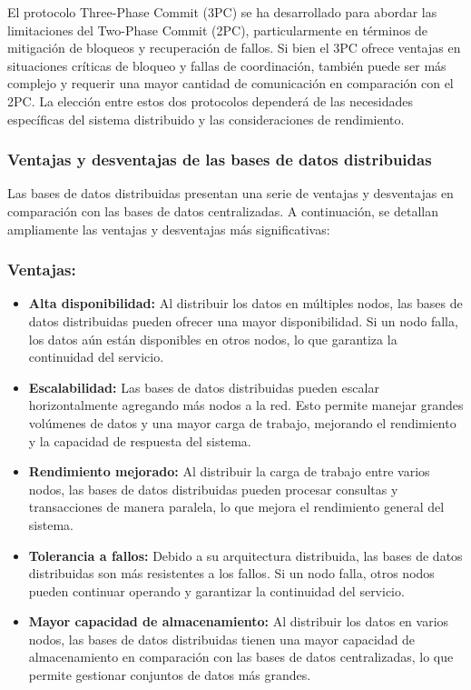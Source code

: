 \begin{tcolorbox}[colback=yellow!10!white, colframe=blue!50!black, title=Resumiendo, coltitle=white]
	El protocolo Three-Phase Commit (3PC) se ha desarrollado para abordar las limitaciones del Two-Phase Commit (2PC), particularmente en términos de mitigación de bloqueos y recuperación de fallos. Si bien el 3PC ofrece ventajas en situaciones críticas de bloqueo y fallas de coordinación, también puede ser más complejo y requerir una mayor cantidad de comunicación en comparación con el 2PC. La elección entre estos dos protocolos dependerá de las necesidades específicas del sistema distribuido y las consideraciones de rendimiento.
\end{tcolorbox}

\subsubsection{Ventajas y desventajas de las bases de datos distribuidas}
\noindent
Las bases de datos distribuidas presentan una serie de ventajas y desventajas en comparación con las bases de datos centralizadas. A continuación, se detallan ampliamente las ventajas y desventajas más significativas:

\subsubsection{Ventajas:}
\noindent
\begin{itemize}
	\item \textbf{Alta disponibilidad:} Al distribuir los datos en múltiples nodos, las bases de datos distribuidas pueden ofrecer una mayor disponibilidad. Si un nodo falla, los datos aún están disponibles en otros nodos, lo que garantiza la continuidad del servicio.
	\item \textbf{Escalabilidad:} Las bases de datos distribuidas pueden escalar horizontalmente agregando más nodos a la red. Esto permite manejar grandes volúmenes de datos y una mayor carga de trabajo, mejorando el rendimiento y la capacidad de respuesta del sistema.
	\item \textbf{Rendimiento mejorado:} Al distribuir la carga de trabajo entre varios nodos, las bases de datos distribuidas pueden procesar consultas y transacciones de manera paralela, lo que mejora el rendimiento general del sistema.
	\item \textbf{Tolerancia a fallos:} Debido a su arquitectura distribuida, las bases de datos distribuidas son más resistentes a los fallos. Si un nodo falla, otros nodos pueden continuar operando y garantizar la continuidad del servicio.
	\item \textbf{Mayor capacidad de almacenamiento:} Al distribuir los datos en varios nodos, las bases de datos distribuidas tienen una mayor capacidad de almacenamiento en comparación con las bases de datos centralizadas, lo que permite gestionar conjuntos de datos más grandes.
\end{itemize}

